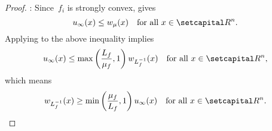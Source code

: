 \documentclass[../main]{subfiles}
\begin{document}
\begin{proof}
    :
    Since~$f_i$ is strongly convex,  gives
    \begin{equation}
        u_\infty(x) \le w_\mu(x) \forallcondition{x \in \setR^n}
        .\end{equation}
    Applying  to the above inequality implies
    \begin{equation}
        u_\infty(x) \le \max \left( \frac{L_f}{\mu_f}, 1 \right) w_{L_f^{-1}}(x) \forallcondition{x \in \setR^n}
        ,\end{equation}
    which means
    \begin{equation}
        w_{L_f^{-1}}(x) \ge \min \left( \frac{\mu_f}{L_f}, 1 \right) u_\infty(x) \forallcondition{x \in \setR^n}
        .\end{equation}


\end{proof}
\end{document}

